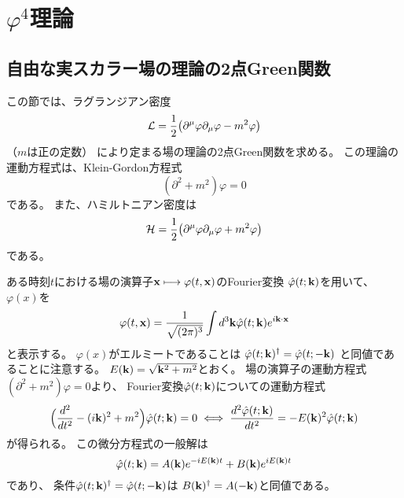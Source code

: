 \section{$\varphi^4$理論}

\subsection{自由な実スカラー場の理論の2点Green関数}
この節では、ラグランジアン密度
\begin{equation}
  \mathcal{L}=\frac{1}{2}\bigl(\partial^\mu\varphi\partial_\mu\varphi-m^2\varphi\bigr)
\end{equation}
（$m$は正の定数）
により定まる場の理論の2点Green関数を求める。
この理論の運動方程式は、Klein-Gordon方程式
\begin{equation}
  (\partial^2+m^2)\varphi=0
\end{equation}
である。
また、ハミルトニアン密度は
\begin{equation}
  \mathcal{H}=\frac{1}{2}\bigl(\partial^\mu\varphi\partial_\mu\varphi+m^2\varphi\bigr)
\end{equation}
である。

ある時刻$t$における場の演算子$\mathbf{x} \longmapsto \varphi(t,\mathbf{x})$のFourier変換
$\hat{\varphi}(t;\mathbf{k})$を用いて、
$\varphi(x)$を
\begin{equation}
  \varphi(t,\mathbf{x})=
  \frac{1}{\sqrt{(2\pi)^3}}
  \int d^3\mathbf{k}\hat{\varphi}(t;\mathbf{k}) e^{i\mathbf{k}\cdot\mathbf{x}}
\end{equation}
と表示する。
$\varphi(x)$がエルミートであることは
$\hat{\varphi}(t;\mathbf{k})^\dagger=\hat{\varphi}(t;-\mathbf{k})$
と同値であることに注意する。
$E(\mathbf{k})=\sqrt{\mathbf{k}^2+m^2}$とおく。
場の演算子の運動方程式$(\partial^2+m^2)\varphi=0$より、
Fourier変換$\hat{\varphi}(t;\mathbf{k})$についての運動方程式
\begin{equation}
  \Bigl(\frac{d^2}{dt^2} - (i\mathbf{k})^2 + m^2\Bigr)\hat{\varphi}(t;\mathbf{k}) = 0
  \iff
  \frac{d^2\hat{\varphi}(t;\mathbf{k})}{dt^2} = -E(\mathbf{k})^2\hat{\varphi}(t;\mathbf{k})
\end{equation}
が得られる。
この微分方程式の一般解は
\begin{equation}
  \hat{\varphi}(t;\mathbf{k})=
  A(\mathbf{k})e^{-iE(\mathbf{k})t}
  +
  B(\mathbf{k})e^{iE(\mathbf{k})t}
\end{equation}
であり、
条件$\hat{\varphi}(t;\mathbf{k})^\dagger=\hat{\varphi}(t;-\mathbf{k})$は
$B(\mathbf{k})^\dagger=A(-\mathbf{k})$と同値である。

